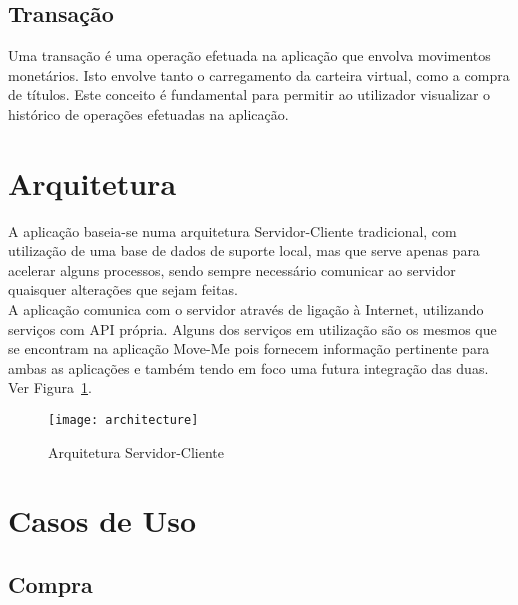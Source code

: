 \subsection{Transação}
Uma transação é uma operação efetuada na aplicação que envolva movimentos monetários. Isto envolve tanto o carregamento da carteira virtual, como a compra de títulos. Este conceito é fundamental para permitir ao utilizador visualizar o histórico de operações efetuadas na aplicação.

\section{Arquitetura}

A aplicação baseia-se numa arquitetura Servidor-Cliente tradicional, com utilização de uma base de dados de suporte local, mas que serve apenas para acelerar alguns processos, sendo sempre necessário comunicar ao servidor quaisquer alterações que sejam feitas.
\\A aplicação comunica com o servidor através de ligação à Internet, utilizando serviços \web com API própria. Alguns dos serviços em utilização são os mesmos que se encontram na aplicação Move-Me pois fornecem informação pertinente para ambas as aplicações e também tendo em foco uma futura integração das duas. Ver Figura~\ref{fig:architecture}.

\begin{figure}[t]
  \begin{center}
    \leavevmode
    \texttt{[image: architecture]}
    \caption{Arquitetura Servidor-Cliente}
    \label{fig:architecture}
  \end{center}
\end{figure}

\section{Casos de Uso}

\subsection{Compra}

